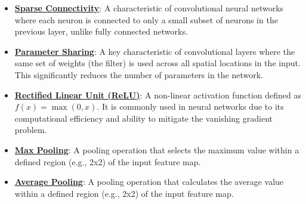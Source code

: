 \documentclass{article}%
\begin{document}
\begin{itemize}[leftmargin=*]
\item \href{https://purdue.brightspace.com/d2l/common/assets/pdfjs-d2l-dist/1.0.14-legacy/web/viewer.html?file=%2Fcontent%2Fenforced%2F1095467-wl.202510.CS.24300.001%2F09L1-cnn.pdf%3Fou%3D1095467&lang=en-us&container=d2l-fileviewer-rendered-pdf&fullscreen=d2l-fileviewer-rendered-pdf-dialog&height=667#page=10}{\textbf{Sparse Connectivity}}: A characteristic of convolutional neural networks where each neuron is connected to only a small subset of neurons in the previous layer, unlike fully connected networks.%
\item \href{https://purdue.brightspace.com/d2l/common/assets/pdfjs-d2l-dist/1.0.14-legacy/web/viewer.html?file=%2Fcontent%2Fenforced%2F1095467-wl.202510.CS.24300.001%2F09L1-cnn.pdf%3Fou%3D1095467&lang=en-us&container=d2l-fileviewer-rendered-pdf&fullscreen=d2l-fileviewer-rendered-pdf-dialog&height=667#page=12}{\textbf{Parameter Sharing}}: A key characteristic of convolutional layers where the same set of weights (the filter) is used across all spatial locations in the input. This significantly reduces the number of parameters in the network.%
\item \href{https://purdue.brightspace.com/d2l/common/assets/pdfjs-d2l-dist/1.0.14-legacy/web/viewer.html?file=%2Fcontent%2Fenforced%2F1095467-wl.202510.CS.24300.001%2F09L1-cnn.pdf%3Fou%3D1095467&lang=en-us&container=d2l-fileviewer-rendered-pdf&fullscreen=d2l-fileviewer-rendered-pdf-dialog&height=667#page=13}{\textbf{Rectified Linear Unit (ReLU)}}: A non-linear activation function defined as $f(x) = \max(0, x)$. It is commonly used in neural networks due to its computational efficiency and ability to mitigate the vanishing gradient problem.%
\item \href{https://purdue.brightspace.com/d2l/common/assets/pdfjs-d2l-dist/1.0.14-legacy/web/viewer.html?file=%2Fcontent%2Fenforced%2F1095467-wl.202510.CS.24300.001%2F09L1-cnn.pdf%3Fou%3D1095467&lang=en-us&container=d2l-fileviewer-rendered-pdf&fullscreen=d2l-fileviewer-rendered-pdf-dialog&height=667#page=14}{\textbf{Max Pooling}}: A pooling operation that selects the maximum value within a defined region (e.g., 2x2) of the input feature map.%
\item \href{https://purdue.brightspace.com/d2l/common/assets/pdfjs-d2l-dist/1.0.14-legacy/web/viewer.html?file=%2Fcontent%2Fenforced%2F1095467-wl.202510.CS.24300.001%2F09L1-cnn.pdf%3Fou%3D1095467&lang=en-us&container=d2l-fileviewer-rendered-pdf&fullscreen=d2l-fileviewer-rendered-pdf-dialog&height=667#page=15}{\textbf{Average Pooling}}: A pooling operation that calculates the average value within a defined region (e.g., 2x2) of the input feature map.%

\end{itemize}
\end{document}
